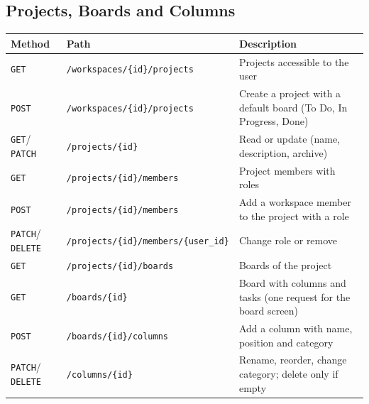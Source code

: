 \documentclass[11pt,a4paper]{article}
\newcommand{\tblstart}{\small\rowcolors{2}{gray!7}{white}}
\newcommand{\code}[1]{\texttt{#1}}
\newcommand{\GET}{\textcolor{green!45!black}{\texttt{GET}}}
\newcommand{\POST}{\textcolor{blue!60!black}{\texttt{POST}}}
\newcommand{\PATCH}{\textcolor{orange!80!black}{\texttt{PATCH}}}
\newcommand{\DEL}{\textcolor{red!65!black}{\texttt{DELETE}}}
\begin{document}
\subsection{Projects, Boards and Columns}
{\tblstart
\begin{xltabular}{\textwidth}{P{1.3cm} P{6.6cm} L}
\toprule
\textbf{Method} & \textbf{Path} & \textbf{Description} \\
\midrule
\endhead
\GET & \code{/workspaces/\{id\}/projects} & Projects accessible to the user \\
\POST & \code{/workspaces/\{id\}/projects} & Create a project with a default board (To Do, In Progress, Done) \\
\GET / \PATCH & \code{/projects/\{id\}} & Read or update (name, description, archive) \\
\GET & \code{/projects/\{id\}/members} & Project members with roles \\
\POST & \code{/projects/\{id\}/members} & Add a workspace member to the project with a role \\
\PATCH / \DEL & \code{/projects/\{id\}/members/\{user\_id\}} & Change role or remove \\
\GET & \code{/projects/\{id\}/boards} & Boards of the project \\
\GET & \code{/boards/\{id\}} & Board with columns and tasks (one request for the board screen) \\
\POST & \code{/boards/\{id\}/columns} & Add a column with name, position and category \\
\PATCH / \DEL & \code{/columns/\{id\}} & Rename, reorder, change category; delete only if empty \\
\bottomrule
\end{xltabular}}
\end{document}
